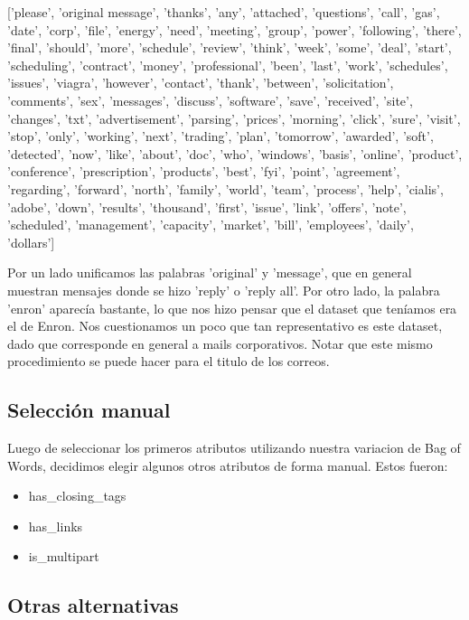 \documentclass[10pt,a4paper]{article}
\begin{document}
['please', 'original message', 'thanks', 'any', 'attached', 'questions', 'call', 'gas', 'date', 'corp', 'file',
	'energy', 'need', 'meeting', 'group', 'power', 'following', 'there', 'final', 'should', 'more', 'schedule',
	'review', 'think', 'week', 'some', 'deal', 'start', 'scheduling', 'contract', 'money', 'professional', 'been',
	'last', 'work', 'schedules', 'issues', 'viagra', 'however', 'contact', 'thank', 'between', 'solicitation', 'comments',
	'sex', 'messages', 'discuss', 'software', 'save', 'received', 'site', 'changes', 'txt', 'advertisement', 'parsing', 'prices',
	'morning', 'click', 'sure', 'visit', 'stop', 'only', 'working', 'next', 'trading', 'plan', 'tomorrow',
	'awarded', 'soft', 'detected', 'now', 'like', 'about', 'doc', 'who', 'windows', 'basis', 'online', 'product', 'conference',
	'prescription', 'products', 'best', 'fyi', 'point', 'agreement', 'regarding', 'forward', 'north', 'family', 'world', 'team',
	'process', 'help', 'cialis', 'adobe', 'down', 'results', 'thousand', 'first', 'issue', 'link', 'offers', 'note',
	'scheduled', 'management', 'capacity', 'market', 'bill', 'employees', 'daily', 'dollars']

\pagebreak

Por un lado unificamos las palabras 'original' y 'message', que en general muestran mensajes donde se hizo 'reply' o 'reply all'. Por otro lado, la palabra 'enron' aparecía bastante, lo que nos hizo pensar que el dataset que teníamos era el de Enron. Nos cuestionamos un poco que tan representativo es este dataset, dado que corresponde en general a mails corporativos. Notar que este mismo procedimiento se puede hacer para el titulo de los correos.

\subsection{Selección manual}

Luego de seleccionar los primeros atributos utilizando nuestra variacion de Bag of Words, decidimos elegir algunos otros atributos de forma manual. Estos fueron:

\begin{itemize}
	\item has\_closing\_tags
	\item has\_links
	\item is\_multipart
\end{itemize}

\subsection{Otras alternativas}
\end{document}
